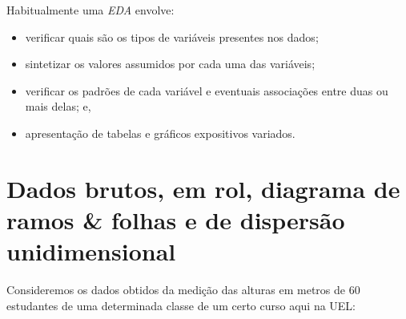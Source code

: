\documentclass[
]{book}
\providecommand{\tightlist}{%
  \setlength{\itemsep}{0pt}\setlength{\parskip}{0pt}}
\begin{document}
\hfill\break

Habitualmente uma \emph{EDA} envolve:

\begin{itemize}
\tightlist
\item
  verificar quais são os tipos de variáveis presentes nos dados;
\item
  sintetizar os valores assumidos por cada uma das variáveis;
\item
  verificar os padrões de cada variável e eventuais associações entre duas ou mais delas; e,
\item
  apresentação de tabelas e gráficos expositivos variados.
\end{itemize}

\hypertarget{dados-brutos-em-rol-diagrama-de-ramos-folhas-e-de-dispersuxe3o-unidimensional}{%
\section{Dados brutos, em rol, diagrama de ramos \& folhas e de dispersão unidimensional}\label{dados-brutos-em-rol-diagrama-de-ramos-folhas-e-de-dispersuxe3o-unidimensional}}

Consideremos os dados obtidos da medição das alturas em metros de 60 estudantes de uma determinada classe de um certo curso aqui na UEL:
\end{document}
